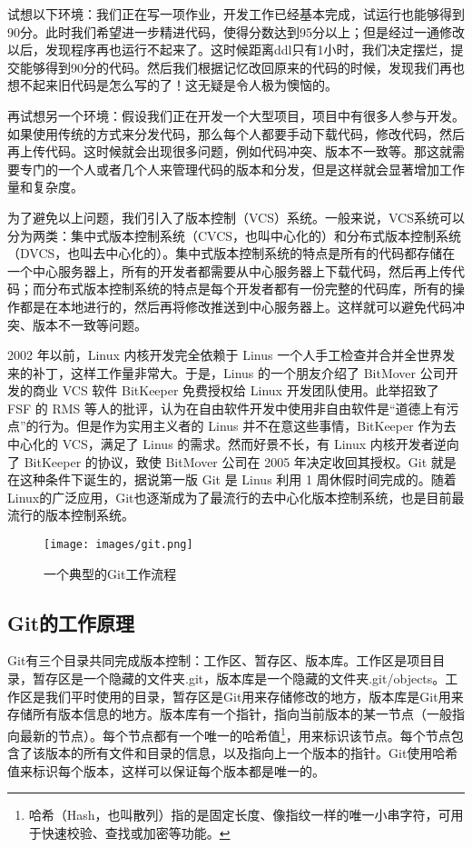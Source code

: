 \documentclass[../main.tex]{subfiles}
\begin{document}
试想以下环境：我们正在写一项作业，开发工作已经基本完成，试运行也能够得到90分。此时我们希望进一步精进代码，使得分数达到95分以上；但是经过一通修改以后，发现程序再也运行不起来了。这时候距离ddl只有1小时，我们决定摆烂，提交能够得到90分的代码。然后我们根据记忆改回原来的代码的时候，发现我们再也想不起来旧代码是怎么写的了！这无疑是令人极为懊恼的。

再试想另一个环境：假设我们正在开发一个大型项目，项目中有很多人参与开发。如果使用传统的方式来分发代码，那么每个人都要手动下载代码，修改代码，然后再上传代码。这时候就会出现很多问题，例如代码冲突、版本不一致等。那这就需要专门的一个人或者几个人来管理代码的版本和分发，但是这样就会显著增加工作量和复杂度。

为了避免以上问题，我们引入了版本控制（VCS）系统。一般来说，VCS系统可以分为两类：集中式版本控制系统（CVCS，也叫中心化的）和分布式版本控制系统（DVCS，也叫去中心化的）。集中式版本控制系统的特点是所有的代码都存储在一个中心服务器上，所有的开发者都需要从中心服务器上下载代码，然后再上传代码；而分布式版本控制系统的特点是每个开发者都有一份完整的代码库，所有的操作都是在本地进行的，然后再将修改推送到中心服务器上。这样就可以避免代码冲突、版本不一致等问题。

2002 年以前，Linux 内核开发完全依赖于 Linus 一个人手工检查并合并全世界发来的补丁，这样工作量非常大。于是，Linus 的一个朋友介绍了 BitMover 公司开发的商业 VCS 软件 BitKeeper 免费授权给 Linux 开发团队使用。此举招致了 FSF 的 RMS 等人的批评，认为在自由软件开发中使用非自由软件是“道德上有污点”的行为。但是作为实用主义者的 Linus 并不在意这些事情，BitKeeper 作为去中心化的 VCS，满足了 Linus 的需求。然而好景不长，有 Linux 内核开发者逆向了 BitKeeper 的协议，致使 BitMover 公司在 2005 年决定收回其授权。Git 就是在这种条件下诞生的，据说第一版 Git 是 Linus 利用 1 周休假时间完成的。随着Linux的广泛应用，Git也逐渐成为了最流行的去中心化版本控制系统，也是目前最流行的版本控制系统。

\begin{figure}[htbp]
  \centering
  \texttt{[image: images/git.png]}
  \caption{一个典型的Git工作流程}
  \label{fig:git-workflow}
\end{figure}

\subsection{Git的工作原理}

Git有三个目录共同完成版本控制：工作区、暂存区、版本库。工作区是项目目录，暂存区是一个隐藏的文件夹.git，版本库是一个隐藏的文件夹.git/objects。工作区是我们平时使用的目录，暂存区是Git用来存储修改的地方，版本库是Git用来存储所有版本信息的地方。版本库有一个指针，指向当前版本的某一节点（一般指向最新的节点）。每个节点都有一个唯一的哈希值\footnote{哈希（Hash，也叫散列）指的是固定长度、像指纹一样的唯一小串字符，可用于快速校验、查找或加密等功能。}，用来标识该节点。每个节点包含了该版本的所有文件和目录的信息，以及指向上一个版本的指针。Git使用哈希值来标识每个版本，这样可以保证每个版本都是唯一的。
\end{document}
